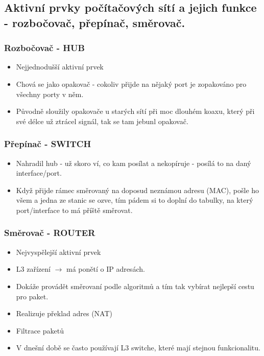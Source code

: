 \documentclass[10pt,a4paper]{article}
\begin{document}
\subsection{Aktivní prvky počítačových sítí a jejich funkce - rozbočovač, přepínač, směrovač.}
\subsubsection{Rozbočovač - HUB}

\begin{itemize}
\item Nejjednodušší aktivní prvek
\item Chová se jako opakovač - cokoliv přijde na nějaký port je zopakováno pro všechny porty v něm.
\item Původně sloužily opakovače u starých sítí při moc dlouhém koaxu, který při své délce už ztrácel signál, tak se tam jebunl opakovač.
\end{itemize}
\subsubsection{Přepínač - SWITCH}

\begin{itemize}
\item Nahradil hub - už skoro ví, co kam posílat a nekopíruje - posílá to na daný interface/port.
\item Když přijde rámec směrovaný na doposud neznámou adresu (MAC), pošle ho všem a jedna ze stanic se ozve, tím pádem si to doplní do tabulky, na který port/interface to má příště směrovat.
\end{itemize}
\subsubsection{Směrovač - ROUTER}

\begin{itemize}
\item Nejvyspělejší aktivní prvek
\item L3 zařízení $\rightarrow$ má ponětí o IP adresách.
\item Dokáže provádět směrovaní podle algoritmů a tím tak vybírat nejlepší cestu pro paket.
\item Realizuje překlad adres (NAT)
\item Filtrace paketů
\item V dnešní době se často používají L3 switche, které mají stejnou funkcionalitu.
\end{itemize}
\end{document}
